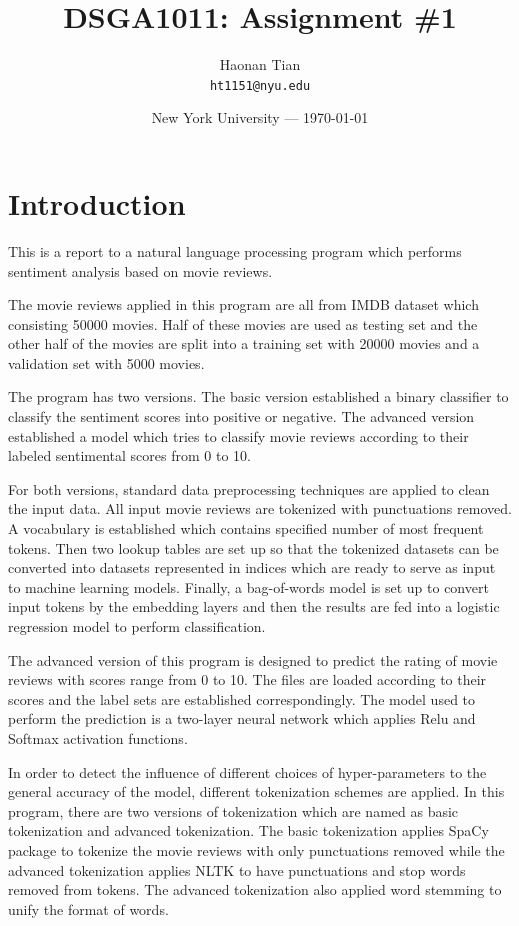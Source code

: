 \documentclass{article}
\title{DSGA1011: Assignment \#1} %
\author{Haonan Tian\\ \texttt{ht1151@nyu.edu}} %
\date{New York University --- \today} %
\begin{document}
\maketitle %


\section*{Introduction} %

This is a report to a natural language processing program which performs sentiment analysis based on movie reviews. 

The movie reviews applied in this program are all from IMDB dataset which consisting 50000 movies. Half of these movies are used as testing set and the other half of the movies are split into a training set with 20000 movies and a validation set with 5000 movies. 

The program has two versions. The basic version established a binary classifier to classify the sentiment scores into positive or negative. The advanced version established a model which tries to classify movie reviews according to their labeled sentimental scores from 0 to 10. 

For both versions, standard data preprocessing techniques are applied to clean the input data. All input movie reviews are tokenized with punctuations removed. A vocabulary is established which contains specified number of most frequent tokens. Then two lookup tables are set up so that the tokenized datasets can be converted into datasets represented in indices which are ready to serve as input to machine learning models. Finally, a bag-of-words model is set up to convert input tokens by the embedding layers and then the results are fed into a logistic regression model to perform classification. 

The advanced version of this program is designed to predict the rating of movie reviews with scores range from 0 to 10. The files are loaded according to their scores and the label sets are established correspondingly. The model used to perform the prediction is a two-layer neural network which applies Relu and Softmax activation functions. 

In order to detect the influence of different choices of hyper-parameters to the general accuracy of the model, different tokenization schemes are applied. In this program, there are two versions of tokenization which are named as basic tokenization and advanced tokenization. The basic tokenization applies SpaCy package to tokenize the movie reviews with only punctuations removed while the advanced tokenization applies NLTK to have punctuations and stop words removed from tokens. The advanced tokenization also applied word stemming to unify the format of words. 
\end{document}
